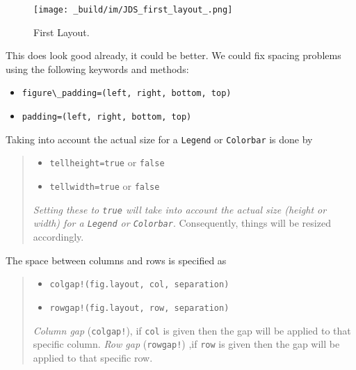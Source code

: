 \documentclass[
  notoc %
]{tufte-book}
\providecommand{\tightlist}{%
  \setlength{\itemsep}{0pt}\setlength{\parskip}{0pt}
}
\newcommand{\passthrough}[1]{#1}
\begin{document}
\begin{figure}
\hypertarget{fig:first_layout}{%
\centering
\texttt{[image: \_build/im/JDS\_first\_layout\_.png]}
\caption{First Layout.}\label{fig:first_layout}
}
\end{figure}

This does look good already, it could be better. We could fix spacing
problems using the following keywords and methods:

\begin{itemize}
\tightlist
\item
  \passthrough{\lstinline!figure\_padding=(left, right, bottom, top)!}
\item
  \passthrough{\lstinline!padding=(left, right, bottom, top)!}
\end{itemize}

Taking into account the actual size for a
\passthrough{\lstinline!Legend!} or \passthrough{\lstinline!Colorbar!}
is done by

\begin{quote}
\begin{itemize}
\tightlist
\item
  \passthrough{\lstinline!tellheight=true!} or
  \passthrough{\lstinline!false!}
\item
  \passthrough{\lstinline!tellwidth=true!} or
  \passthrough{\lstinline!false!}
\end{itemize}

\emph{Setting these to \passthrough{\lstinline!true!} will take into
account the actual size (height or width) for a
\passthrough{\lstinline!Legend!} or \passthrough{\lstinline!Colorbar!}}.
Consequently, things will be resized accordingly.
\end{quote}

The space between columns and rows is specified as

\begin{quote}
\begin{itemize}
\tightlist
\item
  \passthrough{\lstinline"colgap!(fig.layout, col, separation)"}
\item
  \passthrough{\lstinline"rowgap!(fig.layout, row, separation)"}
\end{itemize}

\emph{Column gap} (\passthrough{\lstinline"colgap!"}), if
\passthrough{\lstinline!col!} is given then the gap will be applied to
that specific column. \emph{Row gap} (\passthrough{\lstinline"rowgap!"})
,if \passthrough{\lstinline!row!} is given then the gap will be applied
to that specific row.
\end{quote}
\end{document}
